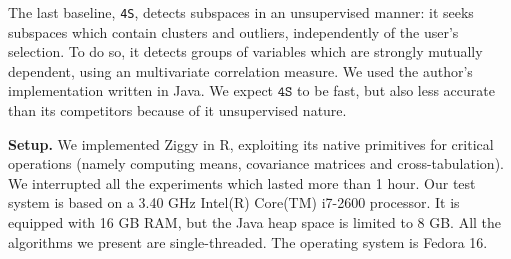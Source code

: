 The last baseline, \texttt{4S}, detects subspaces in an unsupervised manner: it
seeks subspaces which contain clusters and outliers, independently of the
user's selection. To do so, it detects groups of variables which are strongly
mutually dependent, using an multivariate correlation measure. We used the
author's implementation written in Java. We expect $\texttt{4S}$ to be fast,
but also less accurate than its competitors because of it unsupervised nature.

\textbf{Setup.} We implemented Ziggy in R, exploiting its native primitives for critical
operations (namely computing means, covariance matrices and cross-tabulation).
We interrupted all the experiments which lasted more than 1 hour. Our test
system is based on a 3.40 GHz Intel(R) Core(TM) i7-2600 processor. It is
equipped with 16 GB RAM, but the Java heap space is limited to 8 GB. All the
algorithms we present are single-threaded. The operating system is Fedora 16.

